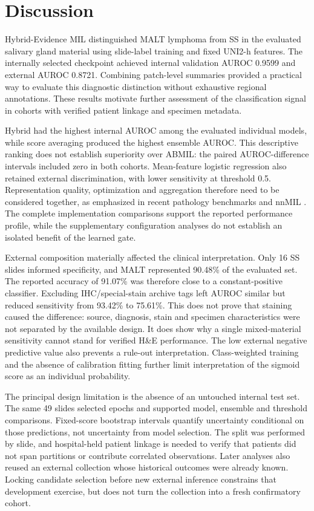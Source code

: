 \section{Discussion}
Hybrid-Evidence MIL distinguished MALT lymphoma from SS in the evaluated salivary gland material using slide-label training and fixed UNI2-h features. The internally selected checkpoint achieved internal validation AUROC 0.9599 and external AUROC 0.8721. Combining patch-level summaries provided a practical way to evaluate this diagnostic distinction without exhaustive regional annotations. These results motivate further assessment of the classification signal in cohorts with verified patient linkage and specimen metadata.

Hybrid had the highest internal AUROC among the evaluated individual models, while score averaging produced the highest ensemble AUROC. This descriptive ranking does not establish superiority over ABMIL: the paired AUROC-difference intervals included zero in both cohorts. Mean-feature logistic regression also retained external discrimination, with lower sensitivity at threshold 0.5. Representation quality, optimization and aggregation therefore need to be considered together, as emphasized in recent pathology benchmarks and nnMIL \citep{ref25,ref26}. The complete implementation comparisons support the reported performance profile, while the supplementary configuration analyses do not establish an isolated benefit of the learned gate.

External composition materially affected the clinical interpretation. Only 16 SS slides informed specificity, and MALT represented 90.48\% of the evaluated set. The reported accuracy of 91.07\% was therefore close to a constant-positive classifier. Excluding IHC/special-stain archive tags left AUROC similar but reduced sensitivity from 93.42\% to 75.61\%. This does not prove that staining caused the difference: source, diagnosis, stain and specimen characteristics were not separated by the available design. It does show why a single mixed-material sensitivity cannot stand for verified H\&E performance. The low external negative predictive value also prevents a rule-out interpretation. Class-weighted training and the absence of calibration fitting further limit interpretation of the sigmoid score as an individual probability.

The principal design limitation is the absence of an untouched internal test set. The same 49 slides selected epochs and supported model, ensemble and threshold comparisons. Fixed-score bootstrap intervals quantify uncertainty conditional on those predictions, not uncertainty from model selection. The split was performed by slide, and hospital-held patient linkage is needed to verify that patients did not span partitions or contribute correlated observations. Later analyses also reused an external collection whose historical outcomes were already known. Locking candidate selection before new external inference constrains that development exercise, but does not turn the collection into a fresh confirmatory cohort.

